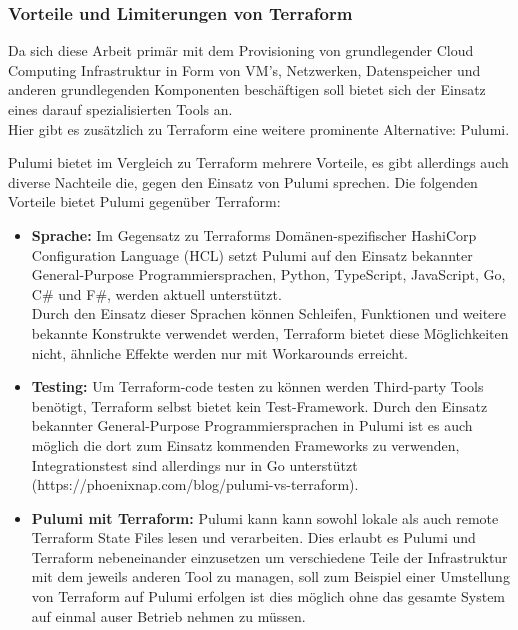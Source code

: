 \subsubsection{Vorteile und Limiterungen von Terraform}

Da sich diese Arbeit primär mit dem Provisioning von grundlegender Cloud
Computing Infrastruktur in Form von VM's, Netzwerken, Datenspeicher und
anderen grundlegenden Komponenten beschäftigen soll bietet sich der Einsatz
eines darauf spezialisierten Tools an.\\
Hier gibt es zusätzlich zu Terraform eine weitere prominente Alternative:
Pulumi.

Pulumi bietet im Vergleich zu Terraform mehrere Vorteile, es gibt allerdings
auch diverse Nachteile die, gegen den Einsatz von
Pulumi sprechen. Die folgenden Vorteile bietet Pulumi gegenüber Terraform:

\begin{itemize}
  \item \textbf{Sprache:} Im Gegensatz zu Terraforms Domänen-spezifischer
  HashiCorp Configuration Language (HCL) setzt Pulumi auf den Einsatz
  bekannter General-Purpose Programmiersprachen, Python, TypeScript,
  JavaScript, Go, C\# und F\#, werden aktuell unterstützt.\\
  Durch den Einsatz dieser Sprachen können Schleifen, Funktionen und
  weitere bekannte Konstrukte verwendet werden, Terraform bietet diese
  Möglichkeiten nicht, ähnliche Effekte werden nur mit Workarounds erreicht.

  \item \textbf{Testing:} Um Terraform-code testen zu können werden
  Third-party Tools benötigt, Terraform selbst bietet kein Test-Framework.
  Durch den Einsatz bekannter General-Purpose Programmiersprachen in Pulumi
  ist es auch möglich die dort zum Einsatz kommenden Frameworks zu verwenden,
  Integrationstest sind allerdings nur in Go unterstützt
  (https://phoenixnap.com/blog/pulumi-vs-terraform).
  
  \item \textbf{Pulumi mit Terraform:} Pulumi kann kann sowohl lokale als auch
  remote Terraform State Files lesen und verarbeiten. Dies erlaubt es Pulumi
  und Terraform nebeneinander einzusetzen um verschiedene Teile der
  Infrastruktur mit dem jeweils anderen Tool zu managen, soll zum Beispiel 
  einer Umstellung von Terraform auf Pulumi erfolgen ist dies möglich
  ohne das gesamte System auf einmal auser Betrieb nehmen zu müssen.

\end{itemize}

